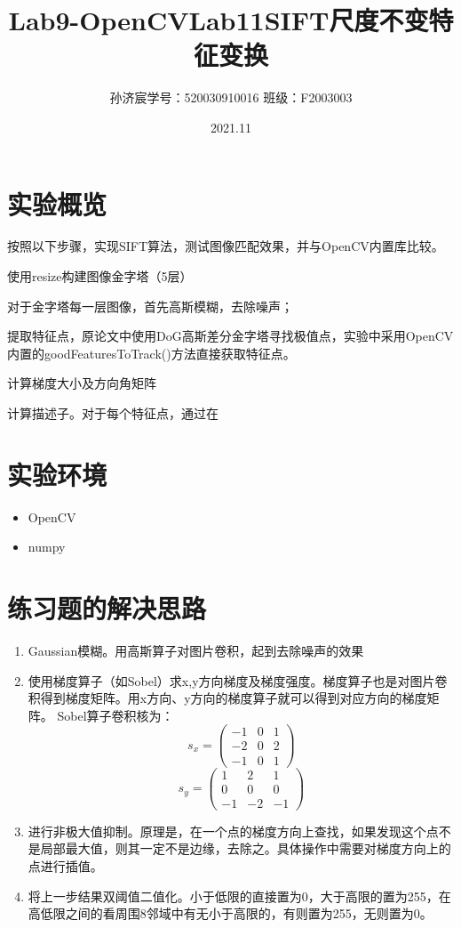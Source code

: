 \documentclass[12pt,a4paper]{article}
\title{Lab9-OpenCV}
\title{Lab11\quad SIFT尺度不变特征变换}
\date{2021.11}
\author{孙济宸\quad \quad 学号：520030910016 \quad  \quad 班级：F2003003}
\begin{document}
\maketitle
\section{实验概览}
按照以下步骤，实现SIFT算法，测试图像匹配效果，并与OpenCV内置库比较。
\begin{item}
\item 使用resize构建图像金字塔（5层）
\item 对于金字塔每一层图像，首先高斯模糊，去除噪声；
\item 提取特征点，原论文中使用DoG高斯差分金字塔寻找极值点，实验中采用OpenCV内置的goodFeaturesToTrack()方法直接获取特征点。
\item 计算梯度大小及方向角矩阵
\item 计算描述子。对于每个特征点，通过在

\end{item}
\section{实验环境}
\begin{itemize}
	\item OpenCV
	\item numpy

\end{itemize}
\newpage

\section{练习题的解决思路}
\begin{enumerate}


\item Gaussian模糊。用高斯算子对图片卷积，起到去除噪声的效果
\item 使用梯度算子（如Sobel）求x,y方向梯度及梯度强度。梯度算子也是对图片卷积得到梯度矩阵。用x方向、y方向的梯度算子就可以得到对应方向的梯度矩阵。 Sobel算子卷积核为：
$$s_x=
\begin{pmatrix}
 -1 & 0 & 1 \\
 -2 & 0 & 2 \\
 -1 & 0 & 1
\end{pmatrix}
$$
$$s_y=
\begin{pmatrix}
 1 & 2 & 1 \\
 0 & 0 & 0 \\
 -1 & -2 & -1
\end{pmatrix}
$$
\item 进行非极大值抑制。原理是，在一个点的梯度方向上查找，如果发现这个点不是局部最大值，则其一定不是边缘，去除之。具体操作中需要对梯度方向上的点进行插值。
\item 将上一步结果双阈值二值化。小于低限的直接置为0，大于高限的置为255，在高低限之间的看周围8邻域中有无小于高限的，有则置为255，无则置为0。
\end{enumerate}
\end{document}
